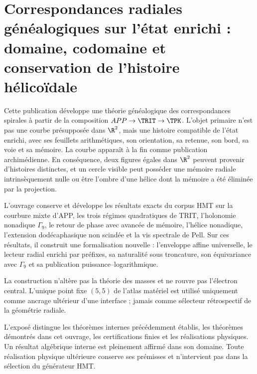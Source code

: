 \part{Correspondances radiales généalogiques sur l'état enrichi : domaine, codomaine et conservation de l'histoire hélicoïdale}
Cette publication développe une théorie généalogique des correspondances spirales à partir de la composition \(APP\to\TRIT\to\TPK\). L'objet primaire n'est pas une courbe présupposée dans \(\R^2\), mais une histoire compatible de l'état enrichi, avec ses feuillets arithmétiques, son orientation, sa retenue, son bord, sa voie et sa mémoire. La courbe apparaît à la fin comme publication archimédienne. En conséquence, deux figures égales dans \(\R^2\) peuvent provenir d'histoires distinctes, et un cercle visible peut posséder une mémoire radiale intrinsèquement nulle ou être l'ombre d'une hélice dont la mémoire a été éliminée par la projection.

L'ouvrage conserve et développe les résultats exacts du corpus HMT sur la courbure mixte d'APP, les trois régimes quadratiques de TRIT, l'holonomie nonadique \(\Gamma_9\), le retour de phase avec avancée de mémoire, l'hélice nonadique, l'extension dodécaphasique non scindée et la vis spectrale de Pell. Sur ces résultats, il construit une formalisation nouvelle : l'enveloppe affine universelle, le lecteur radial enrichi par préfixes, sa naturalité sous troncature, son équivariance avec \(\Gamma_9\) et sa publication puissance--logarithmique.

La construction n'altère pas la théorie des masses et ne rouvre pas l'électron central. L'unique point fixe \((5,5)\) de l'atlas matériel est utilisé uniquement comme ancrage ultérieur d'une interface ; jamais comme sélecteur rétrospectif de la géométrie radiale.

\medskip
\begin{statusbox}[title={Stratification probatoire par domaine et codomaine}]
L'exposé distingue les théorèmes internes précédemment établis, les théorèmes démontrés dans cet ouvrage, les certifications finies et les réalisations physiques. Un résultat algébrique interne est pleinement affirmé dans son domaine. Toute réalisation physique ultérieure conserve ses prémisses et n'intervient pas dans la sélection du générateur HMT.
\end{statusbox}


